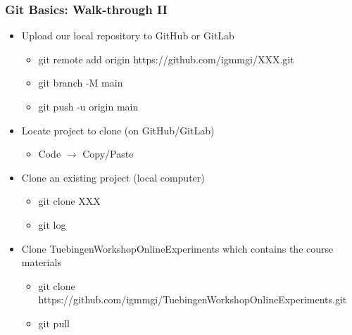 \documentclass[t]{beamer}
\begin{document}
\begin{frame}[fragile]
    \frametitle{Git Basics: Walk-through II}
    \begin{itemize}
        \item Upload our local repository to GitHub or GitLab
            \begin{itemize}
                \item git remote add origin https://github.com/igmmgi/XXX.git
                \item git branch -M main\footnotemark
                \item git push -u origin main
            \end{itemize}
        \item Locate project to clone (on GitHub/GitLab)
            \begin{itemize}
                \item Code $\rightarrow$ Copy/Paste
            \end{itemize}
        \item Clone an existing project (local computer)
            \begin{itemize}
                \item git clone XXX 
                \item git log
            \end{itemize}
        \item Clone TuebingenWorkshopOnlineExperiments which contains the course materials
            \begin{itemize}\scriptsize
                \item git clone https://github.com/igmmgi/TuebingenWorkshopOnlineExperiments.git
                \item git pull
            \end{itemize}
    \end{itemize}
\end{frame}
\end{document}
